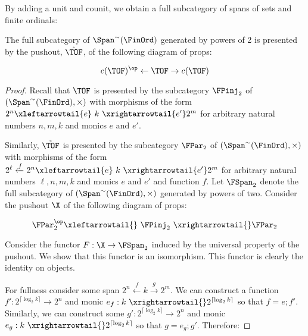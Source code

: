 By adding a unit and counit, we obtain a full subcategory of spans of sets and finite ordinals:

\begin{lemma}
\label{lemma:unitcounit}

 The full subcategory of $\Span^\sim(\FinOrd)$ generated by powers of 2 is presented by the pushout,  $\hat \TOF$, of the following diagram of props:

$$c(\TOF)^\op \leftarrow \TOF \rightarrow c(\TOF)$$
\end{lemma}



\begin{proof}
Recall that $\TOF$ is presented by the subcategory $\FPinj_2$ of $(\Span^\sim (\FinOrd),\times)$ with morphisms of the form $ 2^n \xleftarrowtail{e}\ k\ \xrightarrowtail{e'} 2^m$ for arbitrary natural numbers $n,m,k$ and monics $e$ and $e'$.



Similarly, $\tilde \TOF$ is presented by the subcategory $\FPar_2$ of  $(\Span^\sim (\FinOrd),\times)$ with morphisms of the form $2^\ell \xleftarrow{f}  2^n  \xleftarrowtail{e}\ k \ \xrightarrowtail{e'}  2^m$ for arbitrary natural numbers $\ell, n,m,k$ and monics $e$ and $e'$ and function $f$.
Let $\FSpan_2$ denote the full subcategory of $(\Span^\sim(\FinOrd),\times)$ generated by powers of two.
Consider the pushout $\X$ of the following diagram of props:

$$\FPar_2^\op \xleftarrowtail{}  \ \FPinj_2 \ \xrightarrowtail{} \FPar_2$$ 


Consider the functor $F:\X\to\FSpan_2$ induced by the universal property of the pushout.  We show that this functor is an isomorphism.
This functor is clearly the identity on objects.

For fullness consider some span $2^n \xleftarrow{f} k \xrightarrow{g} 2^m$. We can construct a function $f':2^{\lceil \log_2 k \rceil} \rightarrow 2^n$ and monic $e_f: k \ \xrightarrowtail{} 2^{\lceil \log_2 k \rceil}$ so that $f=e;f'$.  Similarly, we can construct some  $g':2^{\lceil \log_2 k \rceil} \rightarrow 2^n$ and monic $e_g: k\ \xrightarrowtail{} 2^{\lceil \log_2 k \rceil}$ so that $g=e_g;g'$.  Therefore:



\end{proof}

